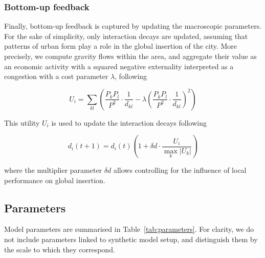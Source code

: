\documentclass[referee,lineno,pdflatex,sn-apa]{sn-jnl}
\begin{document}
	

\subsubsection{Bottom-up feedback}
	
Finally, bottom-up feedback is captured by updating the macroscopic parameters. For the sake of simplicity, only interaction decays are updated, assuming that patterns of urban form play a role in the global insertion of the city. More precisely, we compute gravity flows within the area, and aggregate their value as an economic activity with a squared negative externality interpreted as a congestion with a cost parameter $\lambda$, following
	
\begin{equation}
\label{eq:eq7}
		U_i = \sum_{kl} \left( \frac{P_k P_l}{P^2} \cdot \frac{1}{d_{kl}} - \lambda \left(\frac{P_k P_l}{P^2} \cdot \frac{1}{d_{kl}}\right)^2 \right)
\end{equation}
	
This utility $U_i$ is used to update the interaction decays following
	
\begin{equation}
	d_i (t+1) = d_i (t) \left( 1 + \delta d \cdot \frac{U_i}{\max_k \lvert U_k \rvert } \right) \label{eq:eq8}
\end{equation}

where the multiplier parameter $\delta d$ allows controlling for the influence of local performance on global insertion.





\subsection{Parameters}

Model parameters are summarised in Table~\ref{tab:parameters}. For clarity, we do not include parameters linked to synthetic model setup, and distinguish them by the scale to which they correspond.
	
\end{document}
